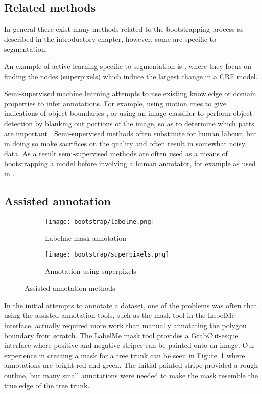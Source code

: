 \subsection{Related methods}


In general there exist many methods related to the bootstrapping process as described in the introductory chapter, however, some are specific to segmentation.  

An example of active learning specific to segmentation is \cite{Xu2017}, where they focus on finding the nodes (superpixels) which induce the largest change in a \gls{CRF} model.

Semi-supervised machine learning attempts to use existing knowledge or domain properties to infer annotations. For example, using motion cues to give indications of object boundaries \cite{Hong2017}, or using an image classifier to perform object detection by blanking out portions of the image, so as to determine which parts are important \cite{Bazzani2016}. Semi-supervised methods often substitute for human labour, but in doing so make sacrifices on the quality and often result in somewhat noisy data. As a result semi-supervised methods are often used as a means of bootstrapping a model before involving a human annotator, for example as used in \cite{Papadopoulos2016}.


\subsection {Assisted annotation}


\begin{figure}[ht]
\centering
\begin{subfigure}{.5\textwidth}
  \centering
  \texttt{[image: bootstrap/labelme.png]}
  \caption{Labelme mask annotation}  
  \label{fig:bootstrap_labelme}
\end{subfigure}%
\begin{subfigure}{.5\textwidth}
  \centering
  \texttt{[image: bootstrap/superpixels.png]}
  \caption{Annotation using superpixels}
  \label{fig:bootstrap_superpixels}
\end{subfigure}

\caption{Assisted annotation methods}
\label{fig:bootstrap_annot_method}
\end{figure}


In the initial attempts to annotate a dataset, one of the problems was often that using the assisted annotation tools, such as the mask tool in the LabelMe \cite{Russell2007} interface, actually required more work than manually annotating the polygon boundary from scratch. The LabelMe mask tool provides a GrabCut-esque interface where positive and negative stripes can be painted onto an image. Our experience in creating a mask for a tree trunk can be seen in Figure~\ref{fig:bootstrap_labelme} where annotations are bright red and green. The initial painted stripe provided a rough outline, but many small annotations were needed to make the mask resemble the true edge of the tree trunk.

